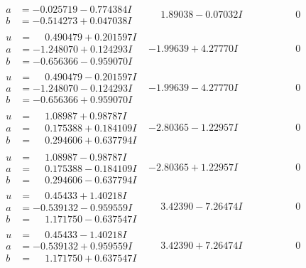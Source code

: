 \documentclass[1p]{elsarticle_modified}
\theoremstyle{definition}
\begin{document}
$$\begin{array}{c|c|c}
\begin{aligned}
a &= -0.025719 - 0.774384 I \\
b &= -0.514273 + 0.047038 I\end{aligned}
 & \phantom{-}1.89038 - 0.07032 I & \phantom{-0.000000 } 0 \\ \hline\begin{aligned}
u &= \phantom{-}0.490479 + 0.201597 I \\
a &= -1.248070 + 0.124293 I \\
b &= -0.656366 - 0.959070 I\end{aligned}
 & -1.99639 + 4.27770 I & \phantom{-0.000000 } 0 \\ \hline\begin{aligned}
u &= \phantom{-}0.490479 - 0.201597 I \\
a &= -1.248070 - 0.124293 I \\
b &= -0.656366 + 0.959070 I\end{aligned}
 & -1.99639 - 4.27770 I & \phantom{-0.000000 } 0 \\ \hline\begin{aligned}
u &= \phantom{-}1.08987 + 0.98787 I \\
a &= \phantom{-}0.175388 + 0.184109 I \\
b &= \phantom{-}0.294606 + 0.637794 I\end{aligned}
 & -2.80365 - 1.22957 I & \phantom{-0.000000 } 0 \\ \hline\begin{aligned}
u &= \phantom{-}1.08987 - 0.98787 I \\
a &= \phantom{-}0.175388 - 0.184109 I \\
b &= \phantom{-}0.294606 - 0.637794 I\end{aligned}
 & -2.80365 + 1.22957 I & \phantom{-0.000000 } 0 \\ \hline\begin{aligned}
u &= \phantom{-}0.45433 + 1.40218 I \\
a &= -0.539132 - 0.959559 I \\
b &= \phantom{-}1.171750 - 0.637547 I\end{aligned}
 & \phantom{-}3.42390 - 7.26474 I & \phantom{-0.000000 } 0 \\ \hline\begin{aligned}
u &= \phantom{-}0.45433 - 1.40218 I \\
a &= -0.539132 + 0.959559 I \\
b &= \phantom{-}1.171750 + 0.637547 I\end{aligned}
 & \phantom{-}3.42390 + 7.26474 I & \phantom{-0.000000 } 0 \\ \hline\begin{aligned}

\end{aligned}
\end{array}$$
\end{document}
